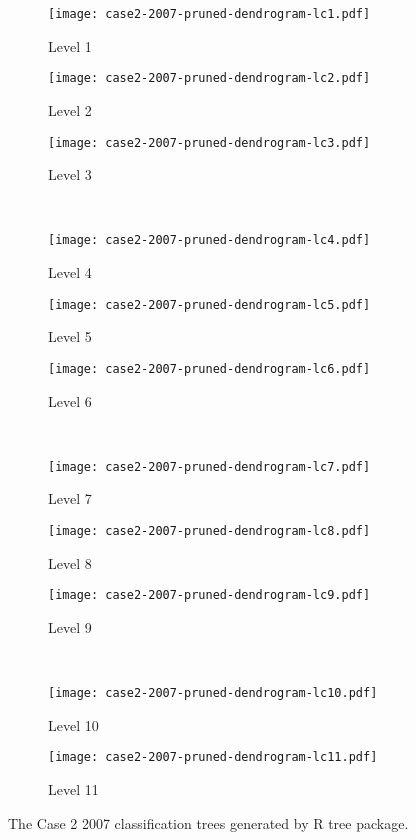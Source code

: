 \begin{appendices}

\begin{figure}[!ht] \centering
	\captionsetup[subfigure]{width=2.0in}
	\begin{subfigure}[t]{0.32\textwidth}
		\texttt{[image: case2-2007-pruned-dendrogram-lc1.pdf]}
		\caption{Level 1}
	\end{subfigure}
	\begin{subfigure}[t]{0.32\textwidth}
		\texttt{[image: case2-2007-pruned-dendrogram-lc2.pdf]}
		\caption{Level 2}
	\end{subfigure}
	\begin{subfigure}[t]{0.32\textwidth}
		\texttt{[image: case2-2007-pruned-dendrogram-lc3.pdf]}
		\caption{Level 3}
	\end{subfigure}\\
	\vspace{5pt}
	\begin{subfigure}[t]{0.32\textwidth}
		\texttt{[image: case2-2007-pruned-dendrogram-lc4.pdf]}
		\caption{Level 4}
	\end{subfigure}
	\begin{subfigure}[t]{0.32\textwidth}
		\texttt{[image: case2-2007-pruned-dendrogram-lc5.pdf]}
		\caption{Level 5}
	\end{subfigure}
	\begin{subfigure}[t]{0.32\textwidth}
		\texttt{[image: case2-2007-pruned-dendrogram-lc6.pdf]}
		\caption{Level 6}
	\end{subfigure}\\
	\vspace{5pt}	
	\begin{subfigure}[t]{0.32\textwidth}
		\texttt{[image: case2-2007-pruned-dendrogram-lc7.pdf]}
		\caption{Level 7}
	\end{subfigure}
	\begin{subfigure}[t]{0.32\textwidth}
		\texttt{[image: case2-2007-pruned-dendrogram-lc8.pdf]}
		\caption{Level 8}
	\end{subfigure}
	\begin{subfigure}[t]{0.32\textwidth}
		\texttt{[image: case2-2007-pruned-dendrogram-lc9.pdf]}
		\caption{Level 9}
	\end{subfigure}\\
	\vspace{5pt}
	\begin{subfigure}[t]{0.32\textwidth}
		\texttt{[image: case2-2007-pruned-dendrogram-lc10.pdf]}
		\caption{Level 10}
	\end{subfigure}
	\begin{subfigure}[t]{0.32\textwidth}
		\texttt{[image: case2-2007-pruned-dendrogram-lc11.pdf]}
		\caption{Level 11}
	\end{subfigure}
	\vspace{5pt}
	\caption[The Case 2 2007 classification trees generated by R tree package.]{The Case 2 2007 classification trees generated by R tree package.}
	\label{fig: appendix-fig.c9.tree}
\end{figure}


\end{appendices}

